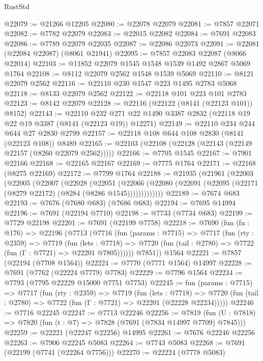 \begin{lexlean}{RustStd}
\begin{coremodule}
@22079 := @21266 @12205
@22080 := @22078 @22079
@22081 := @7857 @22071
@22082 := @7782 @22079
@22083 := @22015 @22082
@22084 := @7691 @22083
@22086 := @7789 @22079 @22035
@22087 := @22086 @22073
@22091 := @22081 (@22084 @22087) (@8061 @21941)
@22095 := @7857 @22083 @22087 (@8066 @22014)
@22103 := @11852 @22079 @1545 @1548 @1539 @1492 @2867 @5069 @1764
@22108 := @8112 @22079 @2562 @1548 @1539 @5069
@22110 := @8121 @22079 @2562
@22116 := @22110 @230 @1547 @223 @1495 @2783 @5068
@22118 := @8133 @22079 @2562
@22122 := @22118 @101 @223 @101 @2783
@22123 := @8142 @22079
@22128 := @22116 (@22122 (@8141 (@22123 @101)) @8152)
@22143 := @22110
    @232
    @271
    @22
    @1490
    @3387
    @2832
    (@22118 @19 @22 @19 @3387 (@8141 (@22123 @19)) @12271)
@22149 := @22110 @234 @244 @644 @27 @2830 @2799
@22157 := @22118 @108 @644 @108 @2830 (@8141 (@22123 @108)) @8489
@22165 := @22103 (@22108 (@22128 (@22143 (@22149 @22157 (@8260 @22079 @2562)))))
@22166 := @7705 @1545
@22167 := @7901 @22166
@22168 := @22165 @22167
@22169 := @7775 @1764
@22171 := @22168 (@8275 @22169)
@22172 := @7799 @1764
@22188 := @21935
    (@21961
      (@22003
        (@22005
          (@22007
            (@22028
              (@22051
                (@22066
                  (@22080 (@22091 (@22095 (@22171 (@8279 @22172) (@8284 (@8286 @1545)))))))))))))
@22189 := @7674 @683
@22193 := @7676 (@7680 @683) (@7686 @683)
@22194 := @7695 @14994
@22196 := @7691 (@22194 @7710)
@22198 := @7733 (@7734 @683)
@22199 := @7729 @22198
@22201 := @7691 (@22199 @7758)
@22218 := @7690
    (fun (fn : @176) =>
    @22196
      (@7713
        (@7716
          (fun (params : @7715) =>
          @7717
            (fun (rty : @2359) =>
            @7719
              (fun (lets : @7718) =>
              @7720 (fun (tail : @2780) => @7722 (fun (Γ : @7721) => @22201 @7805))))))
        @7851))
    @1564
@22221 := @7857 (@22194 (@7708 @1564))
@22224 := @7770 (@7771 @1564) @14997
@22228 := @7691 (@7762 (@22224 @7779) @7783)
@22229 := @7796 @1564
@22234 := @7793 (@7795 @22229 @15000 @7751 @7753)
@22245 := fun (params : @7715) =>
  @7717
    (fun (rty : @2359) =>
    @7719
      (fun (lets : @7718) =>
      @7720 (fun (tail : @2780) => @7722 (fun (Γ : @7721) => @22201 (@22228 @22234)))))
@22246 := @7716 @22245
@22247 := @7713 @22246
@22256 := @7819
    (fun (U : @7818) => @7820 (fun (t : @7) => @7828 (@7691 (@7834 @14997 @7709) @7845)))
@22259 := @22221 (@22247 @22256) @14995
@22261 := @7676 @22246 @22256
@22263 := @7906 @22245 @5083
@22264 := @7743 @5083
@22268 := @7691 (@22199 (@7741 (@22264 @7756)))
@22270 := @22224 (@7778 @5083)

\end{coremodule}
\end{lexlean}
